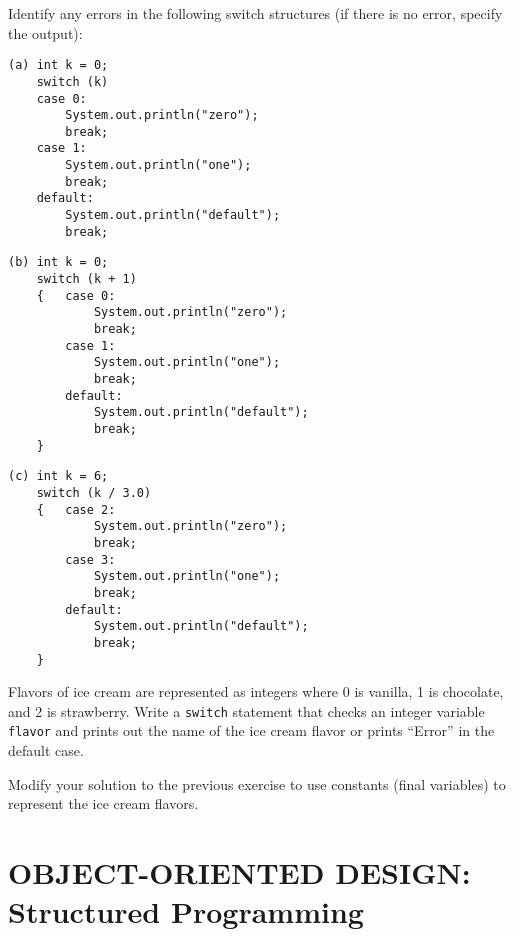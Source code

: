 \newpage
{}
\begin{SSTUDY}
\item  Identify any errors in the
following switch structures (if
there is no error, specify the output):

\begin{jjjlisting}
\begin{lstlisting}
(a) int k = 0;
    switch (k)
    case 0:
        System.out.println("zero");
        break;
    case 1:
        System.out.println("one");
        break;
    default:
        System.out.println("default");
        break;
\end{lstlisting}
\end{jjjlisting}

\begin{jjjlisting}
\begin{lstlisting}
(b) int k = 0;
    switch (k + 1)
    {   case 0:
            System.out.println("zero");
            break;
        case 1:
            System.out.println("one");
            break;
        default:
            System.out.println("default");
            break;
    }
\end{lstlisting}
\end{jjjlisting}
\begin{jjjlisting}
\begin{lstlisting}
(c) int k = 6;
    switch (k / 3.0)
    {   case 2:
            System.out.println("zero");
            break;
        case 3:
            System.out.println("one");
            break;
        default:
            System.out.println("default");
            break;
    }
\end{lstlisting}
\end{jjjlisting}

\item  Flavors of ice cream are represented as integers where 0 is
vanilla, 1 is chocolate, and 2 is strawberry.  Write a {\tt switch}
statement that checks an integer variable {\tt flavor} and prints
out the name of the ice cream flavor or prints ``Error'' in the
default case.

\item  Modify your solution to the previous exercise to use
constants (final variables) to represent the ice cream flavors.
\end{SSTUDY}


\section{OBJECT-ORIENTED DESIGN: \\Structured Programming}

